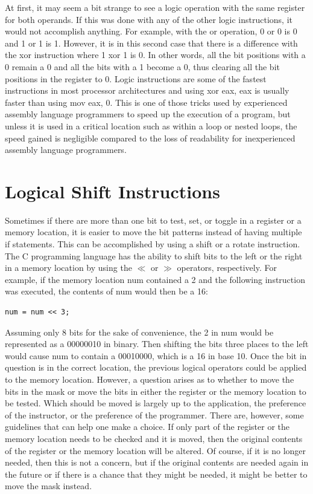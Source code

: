 \documentclass[10pt]{book}
\begin{document}
At first, it may seem a bit strange to see a logic operation with the same register for both operands. If this was done with any of the other logic instructions, it would not accomplish anything. For example, with the or operation, 0 or 0 is 0 and 1 or 1 is 1. However, it is in this second case that there is a difference with the xor instruction where 1 xor 1 is 0. In other words, all the bit positions with a 0 remain a 0 and all the bits with a 1 become a 0, thus clearing all the bit positions in the register to 0. Logic instructions are some of the fastest instructions in most processor architectures and using xor eax, eax is usually faster than using mov eax, 0. This is one of those tricks used by experienced assembly language programmers to speed up the execution of a program, but unless it is used in a critical location such as within a loop or nested loops, the speed gained is negligible compared to the loss of readability for inexperienced assembly language programmers.

\section{Logical Shift Instructions}
Sometimes if there are more than one bit to test, set, or toggle in a register or a memory location, it is easier to move the bit patterns instead of having multiple if statements. This can be accomplished by using a shift or a rotate instruction. The C programming language has the ability to shift bits to the left or the right in a memory location by using the $\ll$ or $\gg$ operators, respectively. For example, if the memory location num contained a 2 and the following instruction was executed, the contents of num would then be a 16:

\begin{verbatim}
num = num << 3;
\end{verbatim}

Assuming only 8 bits for the sake of convenience, the 2 in num would be represented as a 00000010 in binary. Then shifting the bits three places to the left would cause num to contain a 00010000, which is a 16 in base 10. Once the bit in question is in the correct location, the previous logical operators could be applied to the memory location.
However, a question arises as to whether to move the bits in the mask or move the bits in either the register or the memory location to be tested. Which should be moved is largely up to the application, the preference of the instructor, or the preference of the programmer. There are, however, some guidelines that can help one make a choice. If only part of the register or the memory location needs to be checked and it is moved, then the original contents of the register or the memory location will be altered. Of course, if it is no longer needed, then this is not a concern, but if the original contents are needed again in the future or if there is a chance that they might be needed, it might be better to move the mask instead.
\end{document}
